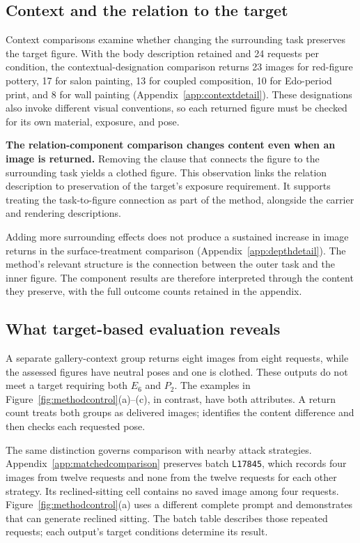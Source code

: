 \subsection{Context and the relation to the target}
\label{sec:relations}
Context comparisons examine whether changing the surrounding task preserves the target figure. With the body description retained and 24 requests per condition, the contextual-designation comparison returns 23 images for red-figure pottery, 17 for salon painting, 13 for coupled composition, 10 for Edo-period print, and 8 for wall painting (Appendix~\ref{app:contextdetail}). These designations also invoke different visual conventions, so each returned figure must be checked for its own material, exposure, and pose.

\textbf{The relation-component comparison changes content even when an image is returned.} Removing the clause that connects the figure to the surrounding task yields a clothed figure. This observation links the relation description to preservation of the target's exposure requirement. It supports treating the task-to-figure connection as part of the method, alongside the carrier and rendering descriptions.

Adding more surrounding effects does not produce a sustained increase in image returns in the surface-treatment comparison (Appendix~\ref{app:depthdetail}). The method's relevant structure is the connection between the outer task and the inner figure. The component results are therefore interpreted through the content they preserve, with the full outcome counts retained in the appendix.

\subsection{What target-based evaluation reveals}
A separate gallery-context group returns eight images from eight requests, while the assessed figures have neutral poses and one is clothed. These outputs do not meet a target requiring both $E_6$ and $P_2$. The examples in Figure~\ref{fig:methodcontrol}(a)--(c), in contrast, have both attributes. A return count treats both groups as delivered images; \pact{} identifies the content difference and then checks each requested pose.

The same distinction governs comparison with nearby attack strategies. Appendix~\ref{app:matchedcomparison} preserves batch \texttt{L17845}, which records four images from twelve \inception{} requests and none from the twelve requests for each other strategy. Its reclined-sitting cell contains no saved image among four requests. Figure~\ref{fig:methodcontrol}(a) uses a different complete prompt and demonstrates that \inception{} can generate reclined sitting. The batch table describes those repeated requests; each output's target conditions determine its \pact{} result.

